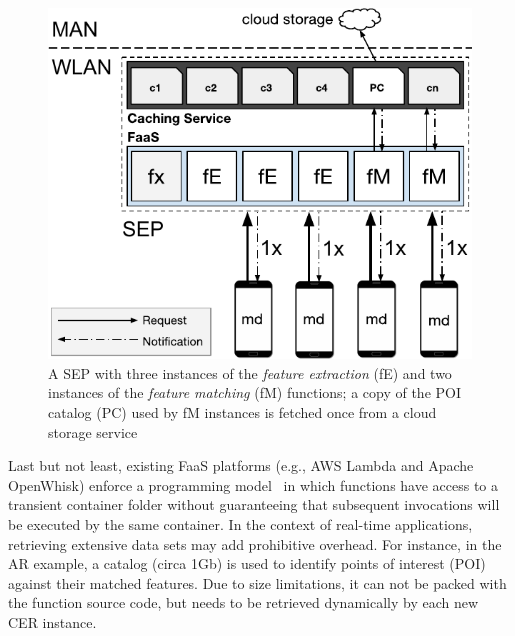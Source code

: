 \begin{figure}[tbp]
	\centering
	\includegraphics[width=0.97\linewidth]{Figs/Mobile_Computation_Offloading_Caching.pdf}
	\caption{A SEP with three instances of the \textit{feature extraction} (fE) and two instances of the \textit{feature matching} (fM) functions; a copy of the POI catalog (PC) used by fM instances is fetched once from a cloud storage service} 
	\label{fig:Mobile_Computation_Offloading_Caching}
\end{figure}

Last but not least, existing FaaS platforms (e.g., AWS Lambda and Apache OpenWhisk) enforce a programming model~\cite{AWSLambda,OpenWhisk} in which functions have access to a transient container folder without guaranteeing that subsequent invocations will be executed by the same container. %
In the context of real-time applications, retrieving extensive data sets may add prohibitive overhead. For instance, in the AR example, a catalog (circa 1Gb) is used to identify points of interest (POI) against their matched features. Due to size limitations, it can not be packed with the function source code, but needs to be retrieved dynamically by each new CER instance.

